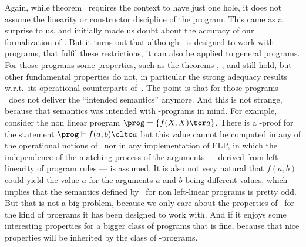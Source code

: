 \documentclass{llncs}
\begin{document}
Again, while theorem~ requires the context to have just
one hole, it does not assume the linearity or constructor discipline
of the program. This came as a surprise to us, and initially made us
doubt about the accuracy of our formalization of \crwl. But it turns
out that although \crwl\ is designed to work with \crwl-programs, that
fulfil these restrictions, it can also be applied to general programs.
For those programs some properties, such as the theorems
, , and
 still hold, but other fundamental properties do
not, in particular the strong adequacy results w.r.t.\ its operational
counterparts of~\cite{GHLR99,ppdp2007,AHHOV05}.
The point is that for those programs \crwl\ does not deliver the
``intended semantics'' anymore. And this is not strange, because that semantics was intended
with \crwl-programs in mind.
For example, consider the non linear
program $\prog = \{f(X,X) \tor a\}$. There is a \crwl-proof for the statement $\prog \vdash f(a,b) \clto
a$ but this value cannot be computed in any of the operational notions
of~\cite{GHLR99,ppdp2007,AHHOV05} nor in any implementation of FLP, in
which the independence of the matching process of the arguments --- derived from left-linearity of program rules --- is
assumed. It is also not very natural that $f(a,b)$ could yield the value $a$ for the arguments $a$ and $b$ being different values, which implies that the semantics defined by \crwl\ for non left-linear programs is pretty odd. But that is not a big problem, because we only care about the properties of \crwl\ for the kind of programs it has been designed to work with. And if it enjoys some interesting properties for a bigger class of programs that is fine, because that nice properties will be inherited by the class of \crwl-programs.
\end{document}

